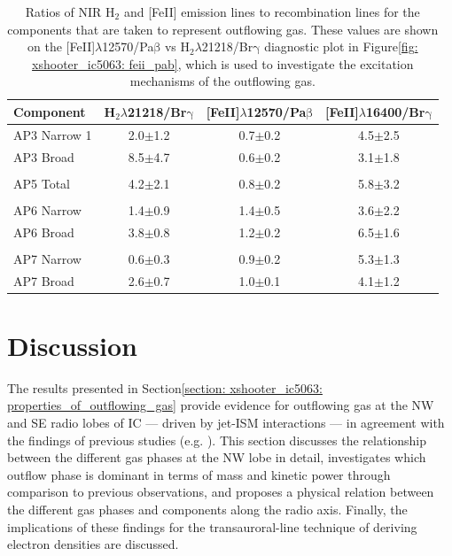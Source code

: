\begin{table}
	\centering
	\renewcommand{\arraystretch}{1.5}
	\begin{tabular}{lccc}
	Component    & H$_2\lambda$21218/Br$\mathrm{\gamma}$ & [FeII]$\lambda$12570/Pa$\mathrm{\beta}$ & [FeII]$\lambda$16400/Br$\mathrm{\gamma}$ \\ \hline
	AP3 Narrow 1 & 2.0$\pm$1.2    & 0.7$\pm$0.2                   & 4.5$\pm$2.5                  \\
	AP3 Broad    & 8.5$\pm$4.7    & 0.6$\pm$0.2                   & 3.1$\pm$1.8                  \\
		&	&	&	\\
	AP5 Total    & 4.2$\pm$2.1    & 0.8$\pm$0.2                   & 5.8$\pm$3.2                  \\
	&	&	&	\\
	AP6 Narrow   & 1.4$\pm$0.9    & 1.4$\pm$0.5                   & 3.6$\pm$2.2                  \\
	AP6 Broad    & 3.8$\pm$0.8    & 1.2$\pm$0.2                   & 6.5$\pm$1.6                  \\
	&	&	&	\\
	AP7 Narrow   & 0.6$\pm$0.3    & 0.9$\pm$0.2                   & 5.3$\pm$1.3                  \\ 
	AP7 Broad    & 2.6$\pm$0.7    & 1.0$\pm$0.1                   & 4.1$\pm$1.2                  \\
	\end{tabular}
	\caption[Ratios of NIR H$_2$ and {[}FeII{]} emission lines to recombination lines for the outflows in IC.]{Ratios of NIR H$_2$ and [FeII] emission lines to recombination lines for the components that are taken to represent outflowing gas. These values are shown on the [FeII]$\lambda$12570/Pa$\mathrm{\beta}$ vs H$_2\lambda$21218/Br$\mathrm{\gamma}$  diagnostic plot in Figure\;\ref{fig: xshooter_ic5063: feii_pab}, which is used to investigate the excitation mechanisms of the outflowing gas.}
	\label{tab: xshooter_ic5063: nir_ratios}
\end{table}


\clearpage
\section{Discussion}
\label{section: xshooter_ic5063: discussion}

The results presented in Section\;\ref{section: xshooter_ic5063: properties_of_outflowing_gas} provide evidence for outflowing gas at the NW and SE radio lobes of IC --- driven by jet-ISM interactions --- in agreement with the findings of previous studies (e.g. \citealt{Morganti2007, Tadhunter2014, Morganti2015}). This section discusses the relationship between the different gas phases at the NW lobe in detail, investigates which outflow phase is dominant in terms of mass and kinetic power through comparison to previous observations, and proposes a physical relation between the different gas phases and components along the radio axis. Finally, the implications of these findings for the transauroral-line technique of deriving electron densities are discussed.

